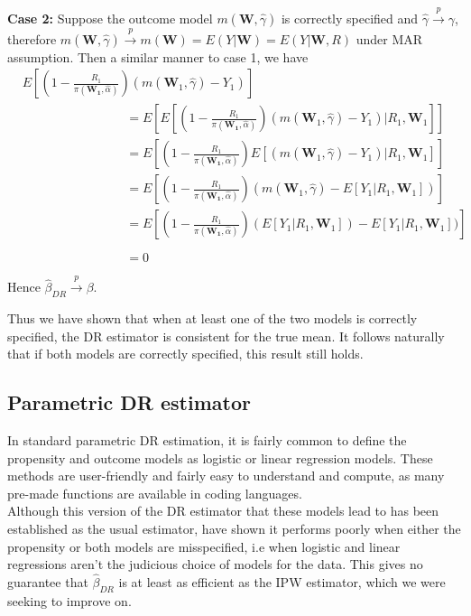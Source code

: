 \documentclass[12pt,twoside]{article}
\begin{document}
\textbf{Case 2:} Suppose the outcome model $m(\mathbf{W}, \hat\gamma)$ is correctly specified and $\hat{\gamma} \xrightarrow{p} \gamma$, therefore  $m(\mathbf{W}, \hat\gamma) \xrightarrow{p} m(\mathbf{W}) = E(Y|\mathbf{W}) = E(Y|\mathbf{W}, R)$ under MAR assumption. Then a similar manner to case 1, we have
\begin{align*}
     & E\left[\left(1 - \frac{R_1}{\pi(\mathbf{W_1},\hat{\alpha})} \right) (m(\mathbf{W}_1, \hat\gamma)-Y_1)\right] \\
     & \phantom{E [(1 - \frac{R_1}{\pi(\mathbf{W_1},\hat{\alpha})})} = E\left[ E\left[\left(1 - \frac{R_1}{\pi(\mathbf{W_1},\hat{\alpha})} \right)(m(\mathbf{W}_1, \hat\gamma)-Y_1)|R_1, \mathbf{W}_1\right]\right] \\
     & \phantom{E [(1 - \frac{R_1}{\pi(\mathbf{W_1},\hat{\alpha})})} = E\left[\left(1 - \frac{R_1}{\pi(\mathbf{W_1},\hat{\alpha})} \right) E\left[(m(\mathbf{W}_1, \hat\gamma)-Y_1)|R_1, \mathbf{W}_1\right]\right] \\
     & \phantom{E [(1 - \frac{R_1}{\pi(\mathbf{W_1},\hat{\alpha})})} = E\left[\left(1 - \frac{R_1}{\pi(\mathbf{W_1},\hat{\alpha})} \right) (m(\mathbf{W}_1, \hat\gamma)-E\left[Y_1|R_1, \mathbf{W}_1\right])\right] \\
     & \phantom{E [(1 - \frac{R_1}{\pi(\mathbf{W_1},\hat{\alpha})})} = E\left[\left(1 - \frac{R_1}{\pi(\mathbf{W_1},\hat{\alpha})} \right) (E\left[Y_1|R_1, \mathbf{W}_1\right])-E\left[Y_1|R_1, \mathbf{W}_1\right])\right] \\
     & \phantom{E [(1 - \frac{R_1}{\pi(\mathbf{W_1},\hat{\alpha})})} = 0
\end{align*}
Hence $\hat{\beta}_{DR} \xrightarrow{p} \beta$.

Thus we have shown that when at least one of the two models is correctly specified, the DR estimator is consistent for the true mean. It follows naturally that if both models are correctly specified, this result still holds.
\subsection{Parametric DR estimator}

In standard parametric DR estimation, it is fairly common to define the propensity and outcome models as logistic or linear regression models. These methods are user-friendly and fairly easy to understand and compute, as many pre-made functions are available in coding languages.\\

Although this version of the DR estimator that these models lead to has been established as the usual estimator, \citeauthor{kang} have shown it performs poorly when either the propensity or both models are misspecified, i.e when logistic and linear regressions aren't the judicious choice of models for the data. This gives no guarantee that $\hat\beta_{DR}$ is at least as efficient as the IPW estimator, which we were seeking to improve on.
\end{document}
